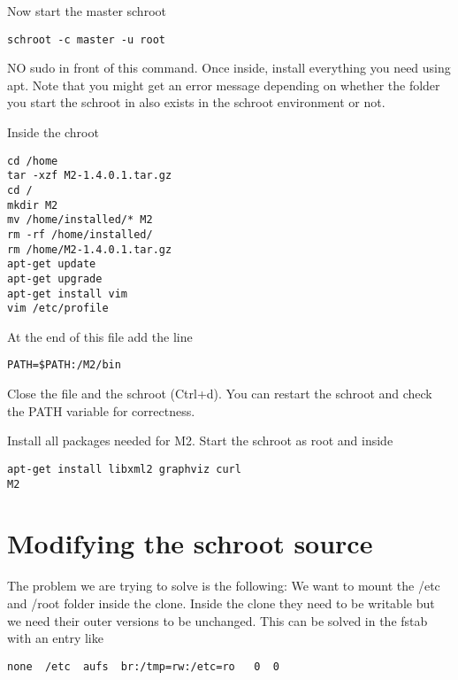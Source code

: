 \documentclass[a4paper]{book}
\begin{document}
Now start the master schroot

\begin{verbatim}
schroot -c master -u root
\end{verbatim}

NO sudo in front of this command. Once inside, install everything you need
using apt.  Note that you might get an error message depending on whether the
folder you start the schroot in also exists in the schroot environment or not.

Inside the chroot

\begin{verbatim}
cd /home
tar -xzf M2-1.4.0.1.tar.gz
cd /
mkdir M2
mv /home/installed/* M2
rm -rf /home/installed/
rm /home/M2-1.4.0.1.tar.gz
apt-get update
apt-get upgrade
apt-get install vim
vim /etc/profile
\end{verbatim}

At the end of this file add the line

\begin{verbatim}
PATH=$PATH:/M2/bin
\end{verbatim}

Close the file and the schroot (Ctrl+d). You can restart the schroot and check
the PATH variable for correctness.

Install all packages needed for M2. Start the schroot as root and inside

\begin{verbatim}
apt-get install libxml2 graphviz curl
M2
\end{verbatim}

\section{Modifying the schroot source}

The problem we are trying to solve is the following: We want to mount the /etc
and /root folder inside the clone. Inside the clone they need to be writable
but we need their outer versions to be unchanged.  This can be solved in the
fstab with an entry like

\begin{verbatim}
none  /etc  aufs  br:/tmp=rw:/etc=ro   0  0
\end{verbatim}
\end{document}
